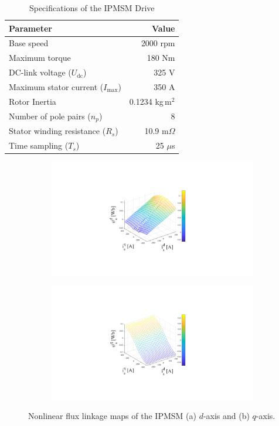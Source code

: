 \begin{table}[t]
\caption{Specifications of the IPMSM Drive}\label{Tab4.1}
\centering
\begin{tabular}{l r}
\toprule
\hline
\textbf{Parameter} & \textbf{Value}  \\ \midrule
Base speed & 2000 rpm \\
Maximum torque & 180 Nm\\
DC-link voltage ($U_{\text{dc}}$) & 325 V \\
Maximum stator current ($I_{\text{max}}$) & 350 A \\
Rotor Inertia & 0.1234 kg\,m$^2$ \\
Number of pole pairs ($n_p$) & 8\\
Stator winding resistance ($R_s$) & 10.9 m$\Omega$\\
Time sampling ($T_s$) & 25 $\mu$s \\
\hline
\bottomrule
\end{tabular}
\end{table}
\begin{figure}[t]
    \centering
    \begin{subfigure}[c]{0.47\textwidth}
        \centering
        \includegraphics[scale=0.5]{chapters/Fig4.2a.pdf}
        \caption{}
        \label{Fig:4.2a}
    \end{subfigure}
    \hfill
    \begin{subfigure}[c]{0.47\textwidth}
        \centering
        \includegraphics[scale=0.5]{chapters/Fig4.2b.pdf}
        \caption{}
        \label{Fig:4.2b}
    \end{subfigure}
    \caption{Nonlinear flux linkage maps of the IPMSM (a) $d$-axis and (b) $q$-axis.}
    \label{Fig:4.2}
\end{figure}

